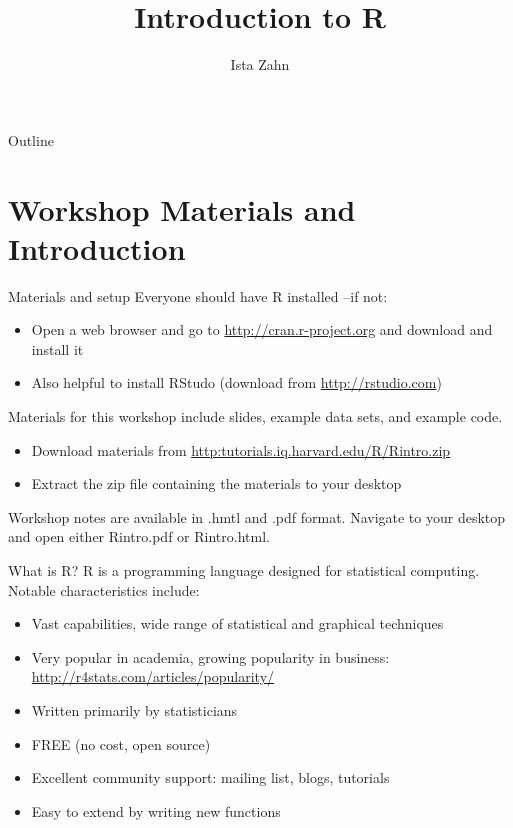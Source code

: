 \documentclass[table,smaller]{beamer}
\author{Ista Zahn}
\date{}
\title{Introduction to R}
\begin{document}
\maketitle
\begin{frame}{Outline}
\tableofcontents
\end{frame}



\section{Workshop Materials and Introduction}
\label{sec-1}

\begin{frame}[label=sec-1-1]{Materials and setup}
Everyone should have R installed --if not:

\begin{itemize}
\item Open a web browser and go to \url{http://cran.r-project.org} and download and install it
\item Also helpful to install RStudo (download from \url{http://rstudio.com})
\end{itemize}

Materials for this workshop include slides, example data sets, and example code.

\begin{itemize}
\item Download materials from \url{http:tutorials.iq.harvard.edu/R/Rintro.zip}
\item Extract the zip file containing the materials to your desktop
\end{itemize}

Workshop notes are available in .hmtl and .pdf format. Navigate to your desktop and open either Rintro.pdf or Rintro.html.
\end{frame}


\begin{frame}[label=sec-1-2]{What is R?}
R is a programming language designed for statistical computing. Notable characteristics include:

\begin{itemize}
\item Vast capabilities, wide range of statistical and graphical techniques

\item Very popular in academia, growing popularity in business: \url{http://r4stats.com/articles/popularity/}

\item Written primarily by statisticians

\item FREE (no cost, open source)

\item Excellent community support: mailing list, blogs, tutorials

\item Easy to extend by writing new functions
\end{itemize}
\end{frame}
\end{document}
